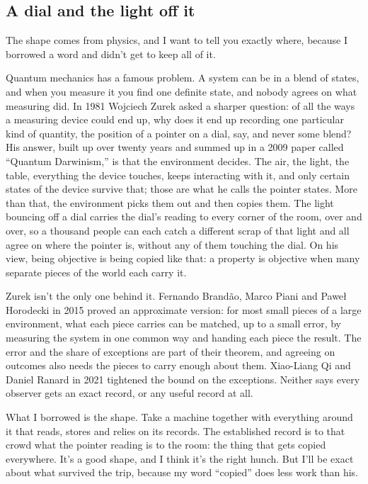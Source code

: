 \documentclass[11pt,twoside]{article}
\theoremstyle{thielethm}
\theoremstyle{thieledef}
\theoremstyle{thieledef}
\theoremstyle{thieledef}
\theoremstyle{thielethm}
\theoremstyle{thieleobs}
\theoremstyle{thielethm}
\begin{document}
\subsection{A dial and the light off it}

The shape comes from physics, and I want to tell you exactly where, because I borrowed a word and didn't get to keep all of it.

Quantum mechanics has a famous problem. A system can be in a blend of states, and when you measure it you find one definite state, and nobody agrees on what measuring did. In 1981 Wojciech Zurek asked a sharper question: of all the ways a measuring device could end up, why does it end up recording one particular kind of quantity, the position of a pointer on a dial, say, and never some blend? His answer, built up over twenty years and summed up in a 2009 paper called ``Quantum Darwinism,'' is that the environment decides. The air, the light, the table, everything the device touches, keeps interacting with it, and only certain states of the device survive that; those are what he calls the pointer states. More than that, the environment picks them out and then copies them. The light bouncing off a dial carries the dial's reading to every corner of the room, over and over, so a thousand people can each catch a different scrap of that light and all agree on where the pointer is, without any of them touching the dial. On his view, being objective is being copied like that: a property is objective when many separate pieces of the world each carry it.

Zurek isn't the only one behind it. Fernando Brandão, Marco Piani and Paweł Horodecki in 2015 proved an approximate version: for most small pieces of a large environment, what each piece carries can be matched, up to a small error, by measuring the system in one common way and handing each piece the result. The error and the share of exceptions are part of their theorem, and agreeing on outcomes also needs the pieces to carry enough about them. Xiao-Liang Qi and Daniel Ranard in 2021 tightened the bound on the exceptions. Neither says every observer gets an exact record, or any useful record at all.

What I borrowed is the shape. Take a machine together with everything around it that reads, stores and relies on its records. The established record is to that crowd what the pointer reading is to the room: the thing that gets copied everywhere. It's a good shape, and I think it's the right hunch. But I'll be exact about what survived the trip, because my word ``copied'' does less work than his.
\end{document}
